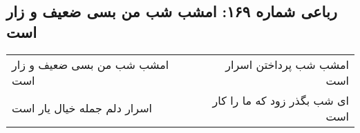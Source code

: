 \begin{center}
\section*{رباعی شماره ۱۶۹: امشب شب من بسی ضعیف و زار است}
\label{sec:0169}
\begin{longtable}{l p{0.5cm} r}
امشب شب من بسی ضعیف و زار است
&&
امشب شب پرداختن اسرار است
\\
اسرار دلم جمله خیال یار است
&&
ای شب بگذر زود که ما را کار است
\\
\end{longtable}
\end{center}
